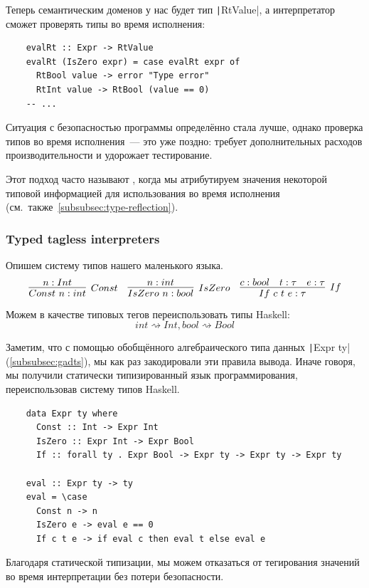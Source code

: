 Теперь семантическим доменов у нас будет тип \texttt|RtValue|, а интерпретатор сможет проверять типы во время исполнения:
\begin{verbatim}
    evalRt :: Expr -> RtValue
    evalRt (IsZero expr) = case evalRt expr of
      RtBool value -> error "Type error"
      RtInt value -> RtBool (value == 0)
    -- ...
\end{verbatim}

Ситуация с безопасностью программы определённо стала лучше, однако проверка типов во время исполнения~--- это уже поздно: требует дополнительных расходов производительности и удорожает тестирование.

Этот подход часто называют , когда мы атрибутируем значения некоторой типовой информацией для использования во время исполнения (см.\ также\ \ref{subsubsec:type-reflection}).

\subsubsection{Typed tagless interpreters} \label{subsubsec:typed-tagless-initial}

Опишем систему типов нашего маленького языка.
\begin{equation*}{}
    \infer[Const]{Const~n : int}{n : Int}
    \quad
    \infer[IsZero]{IsZero~n : bool}{n : int}
    \quad
    \infer[If]{If~c~t~e : \tau}{c : bool & t : \tau & e : \tau}
\end{equation*}
Можем в качестве типовых тегов переиспользовать типы Haskell: \[int \rightsquigarrow Int, bool \rightsquigarrow Bool\]

Заметим, что с помощью обобщённого алгебраического типа данных \texttt|Expr ty| (\ref{subsubsec:gadts}), мы как раз закодировали эти правила вывода.
Иначе говоря, мы получили статически типизированный язык программирования, переиспользовав систему типов Haskell.
\begin{verbatim}
    data Expr ty where
      Const :: Int -> Expr Int
      IsZero :: Expr Int -> Expr Bool
      If :: forall ty . Expr Bool -> Expr ty -> Expr ty -> Expr ty

    eval :: Expr ty -> ty
    eval = \case
      Const n -> n
      IsZero e -> eval e == 0
      If c t e -> if eval c then eval t else eval e
\end{verbatim}

Благодаря статической типизации, мы можем отказаться от тегирования значений во время интерпретации без потери безопасности.

